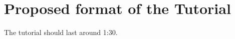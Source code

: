 \documentclass[letterpaper]{article} %
\begin{document}






\section{Proposed format of the Tutorial}
The tutorial should last around 1:30.
\end{document}
